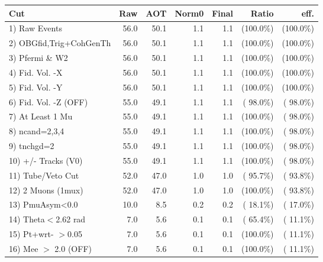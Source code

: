 \begin{table}[h!]\centering
 \begin{tabular}{||l||r|r|r|r|r|r||}
 \hline
 \hline
 Cut & Raw & AOT & Norm0 & Final & Ratio & eff.       \\
 \hline
  1) Raw Events           &         56.0 &         50.1 &          1.1 &          1.1 & (100.0\%) & (100.0\%) \\
  2) OBGfid,Trig+CohGenTh &         56.0 &         50.1 &          1.1 &          1.1 & (100.0\%) & (100.0\%) \\
  3) Pfermi \& W2         &         56.0 &         50.1 &          1.1 &          1.1 & (100.0\%) & (100.0\%) \\
  4) Fid. Vol. -X         &         56.0 &         50.1 &          1.1 &          1.1 & (100.0\%) & (100.0\%) \\
  5) Fid. Vol. -Y         &         56.0 &         50.1 &          1.1 &          1.1 & (100.0\%) & (100.0\%) \\
  6) Fid. Vol. -Z (OFF)   &         55.0 &         49.1 &          1.1 &          1.1 & ( 98.0\%) & ( 98.0\%) \\
  7) At Least 1 Mu        &         55.0 &         49.1 &          1.1 &          1.1 & (100.0\%) & ( 98.0\%) \\
  8) ncand=2,3,4          &         55.0 &         49.1 &          1.1 &          1.1 & (100.0\%) & ( 98.0\%) \\
  9) tnchgd=2             &         55.0 &         49.1 &          1.1 &          1.1 & (100.0\%) & ( 98.0\%) \\
 10) +/- Tracks (V0)      &         55.0 &         49.1 &          1.1 &          1.1 & (100.0\%) & ( 98.0\%) \\
 11) Tube/Veto Cut        &         52.0 &         47.0 &          1.0 &          1.0 & ( 95.7\%) & ( 93.8\%) \\
 12) 2 Muons (1mux)       &         52.0 &         47.0 &          1.0 &          1.0 & (100.0\%) & ( 93.8\%) \\
 13) PmuAsym<0.0          &         10.0 &          8.5 &          0.2 &          0.2 & ( 18.1\%) & ( 17.0\%) \\
 14) Theta$<$2.62 rad     &          7.0 &          5.6 &          0.1 &          0.1 & ( 65.4\%) & ( 11.1\%) \\
 15) Pt+wrt- $>$0.05      &          7.0 &          5.6 &          0.1 &          0.1 & (100.0\%) & ( 11.1\%) \\
 16) Mee $>$ 2.0  (OFF)   &          7.0 &          5.6 &          0.1 &          0.1 & (100.0\%) & ( 11.1\%) \\

\end{tabular}
\end{table}

